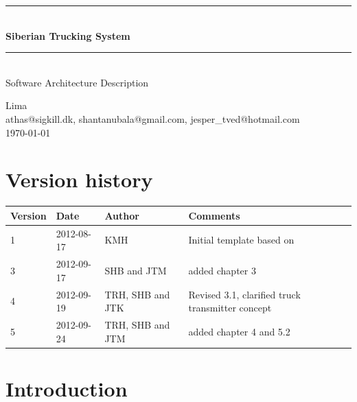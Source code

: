 \documentclass[a4paper,11pt]{report}
\makeatletter
\newcommand{\systemname}{Siberian Trucking System}
\newcommand{\groupname}{Lima}
\newcommand{\contactdetails}{athas@sigkill.dk, shantanubala@gmail.com, jesper\_tved@hotmail.com}
\makeatother
\begin{document}
% 
% 
\newcommand{\HRule}{\rule{\linewidth}{0.5mm}}
\begin{titlepage}

  \begin{center}

    \vspace*{4cm}
    \HRule \\[0.4cm]
    { \huge \bfseries \systemname}\\[0.4cm]
    \HRule \\[1.5cm]

    {\Large Software Architecture Description}

    \vfill
  \end{center}

  \begin{flushleft}
    {\large \groupname}\\[0.2cm]
    {\large \contactdetails}\\[0.2cm]
   {\large \today}
  \end{flushleft}
\end{titlepage}

% 
% 
\newpage
\chapter*{Version history}

\begin{center}
  \begin{tabular}[h!]{| l | l | l | p{8 cm} |}
    \hline
    \rowcolor{gray}
    Version & Date & Author & Comments \\
    \hline
    \hline
    1 & 2012-08-17 & KMH & Initial template based on
    \citep{rozanski2011software} \\
    \hline
    3 & 2012-09-17 & SHB and JTM & added chapter 3\\
    \hline
    4 & 2012-09-19 & TRH, SHB and JTK & Revised 3.1, clarified truck transmitter concept \\
    \hline
    5 & 2012-09-24 & TRH, SHB and JTM & added chapter 4 and 5.2\\
   \hline
  \end{tabular}
\end{center}

% 
% 
\setcounter{tocdepth}{1}
\tableofcontents

% 
% 
\chapter{Introduction}
\label{cha:introduction}
\thispagestyle{fancy}
\end{document}
